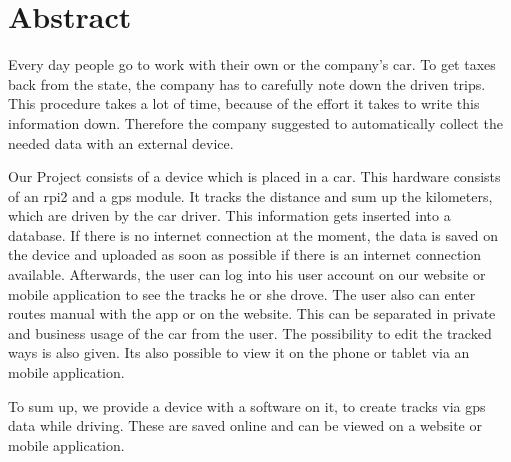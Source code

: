 \chapter*{Abstract}
Every day people go to work with their own or the company's car. To get taxes back from the state, the company has to carefully note down the driven trips. This procedure takes a lot of time,  because of the effort it takes to write this information down. Therefore the company suggested to automatically collect the needed data with an external device.

Our Project consists of a device which is placed in a car. This hardware consists of an \gls{rpi2} and a \gls{gps} module. It tracks the distance and sum up the kilometers, which are driven by the car driver. This information gets inserted into a database. If there is no internet connection at the moment, the data is saved on the device and uploaded as soon as possible if there is an internet connection available. Afterwards, the user can log into his user account on our website or mobile application to see the tracks he or she drove. The user also can enter routes manual with the app or on the website. This can be separated in private and business usage of the car from the user. The possibility to edit the tracked ways is also given. Its also possible to view it on the phone or tablet via an mobile application.

To sum up, we provide a device with a software on it, to create tracks via \gls{gps} data while driving. These are saved online and can be viewed on a website or mobile application.
